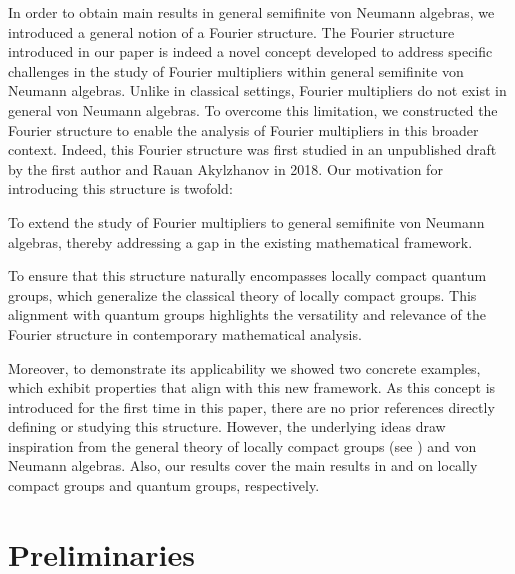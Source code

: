 \documentclass[a4paper,12pt]{amsart}
\numberwithin{equation}{section}
\theoremstyle{definition}
\begin{document}
In order to obtain main results in general semifinite von Neumann algebras, we introduced a general notion of a Fourier structure. The Fourier
structure introduced in our paper is indeed a novel concept developed to address
specific challenges in the study of Fourier multipliers within general semifinite
von Neumann algebras. Unlike in classical settings, Fourier multipliers do not
exist in general von Neumann algebras. To overcome this limitation, we constructed the Fourier structure to enable the analysis of Fourier multipliers in this broader context.
Indeed, this Fourier
structure was first studied in an unpublished draft by the first author and Rauan Akylzhanov in 2018. Our motivation for introducing this structure is twofold:

To extend the study of Fourier multipliers to general semifinite von Neumann algebras, thereby addressing a gap in the existing mathematical framework.

To ensure that this structure naturally encompasses locally compact quantum groups, which generalize the classical theory of locally compact groups. This alignment with quantum groups highlights the versatility and relevance of the Fourier structure in contemporary mathematical analysis. 

Moreover, to demonstrate its applicability we showed two concrete examples, which exhibit properties that align with this new framework.
As this concept is introduced for the first time in this paper, there are no prior references directly defining or studying this structure. However, the underlying ideas draw inspiration from the general theory of locally compact groups (see \cite{Cas}) and von Neumann algebras. Also, our results cover the main results in \cite[Theorem 5.1]{AR} and \cite[Theorem 1.3]{Z} on locally compact groups and quantum groups, respectively.


\bigskip
\section{Preliminaries}
\end{document}
